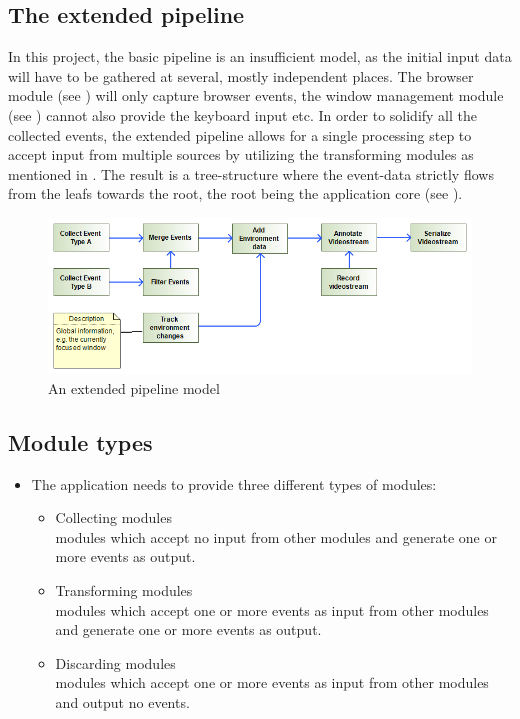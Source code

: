 \subsection{The extended pipeline}
\label{sec:sm_extpipe}
In this project, the basic pipeline is an insufficient model, as the initial input data will have to be gathered at several, mostly independent places. The \gls{browser} module (see ) will only capture \gls{browser} \glspl{event}, the window management \gls{module} (see ) cannot also provide the keyboard input etc. In order to solidify all the collected \glspl{event}, the extended pipeline allows for a single processing step to accept input from multiple sources by utilizing the transforming modules as mentioned in . The result is a tree-structure where the \gls{event}-data strictly flows from the leafs towards the root, the root being the application core (see ).
\begin{figure}[h!]
  \includegraphics[width=1.00\textwidth]{resources/extendedpipeline.png}
  \centering
  \caption{An extended pipeline model}
  \label{fig:sm_extpipe}
\end{figure}

\subsection{Module types}
\label{sec:module-types}

\begin{itemize}
    \item{The application needs to provide three different types of \glspl{module}:
    \begin{itemize}
        \item Collecting \glspl{module}\label{collecting-module}\\\Glspl{module} which accept no input from other \glspl{module} and generate one or more \glspl{event} as output.
        \item Transforming \glspl{module}\label{transforming-module}\\\Glspl{module} which accept one or more \glspl{event} as input from other \glspl{module} and generate one or more \glspl{event} as output.
        \item Discarding \glspl{module}\label{discarding-module}\\\Glspl{module} which accept one or more \glspl{event} as input from other \glspl{module} and output no \glspl{event}.
    \end{itemize}}
\end{itemize}

